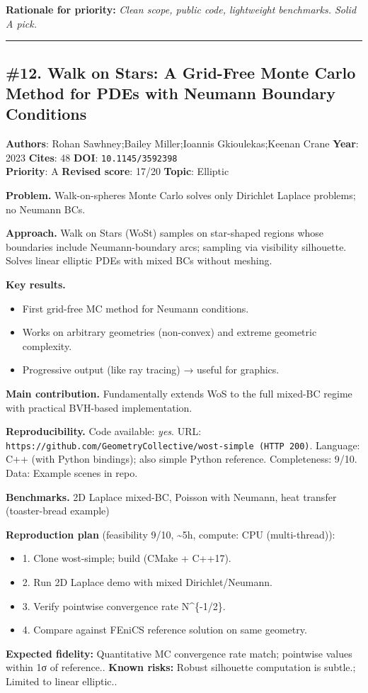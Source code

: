 \documentclass[10pt,letterpaper]{article}
\begin{document}
\textbf{Rationale for priority:} \emph{Clean scope, public code, lightweight benchmarks. Solid A pick.}

\medskip\hrule\medskip

\subsection*{\#12. Walk on Stars: A Grid-Free Monte Carlo Method for PDEs with Neumann Boundary Conditions}
\textbf{Authors}: Rohan Sawhney;Bailey Miller;Ioannis Gkioulekas;Keenan Crane \textbullet{} \textbf{Year}: 2023 \textbullet{} \textbf{Cites}: 48 \textbullet{} \textbf{DOI}: \texttt{10.1145/3592398} \\
\textbf{Priority}: A \textbullet{} \textbf{Revised score}: 17/20 \textbullet{} \textbf{Topic}: Elliptic

\textbf{Problem.} Walk-on-spheres Monte Carlo solves only Dirichlet Laplace problems; no Neumann BCs.

\textbf{Approach.} Walk on Stars (WoSt) samples on star-shaped regions whose boundaries include Neumann-boundary arcs; sampling via visibility silhouette. Solves linear elliptic PDEs with mixed BCs without meshing.

\textbf{Key results.}
\begin{itemize}
\item First grid-free MC method for Neumann conditions.
\item Works on arbitrary geometries (non-convex) and extreme geometric complexity.
\item Progressive output (like ray tracing) → useful for graphics.
\end{itemize}

\textbf{Main contribution.} Fundamentally extends WoS to the full mixed-BC regime with practical BVH-based implementation.

\textbf{Reproducibility.} Code available: \emph{yes}. URL: \texttt{https://github.com/GeometryCollective/wost-simple (HTTP 200)}. Language: C++ (with Python bindings); also simple Python reference. Completeness: 9/10. Data: Example scenes in repo.

\textbf{Benchmarks.} 2D Laplace mixed-BC, Poisson with Neumann, heat transfer (toaster-bread example)

\textbf{Reproduction plan} (feasibility 9/10, \textasciitilde5h, compute: CPU (multi-thread)):
\begin{itemize}
\item 1. Clone wost-simple; build (CMake + C++17).
\item 2. Run 2D Laplace demo with mixed Dirichlet/Neumann.
\item 3. Verify pointwise convergence rate N\^{}\{-1/2\}.
\item 4. Compare against FEniCS reference solution on same geometry.
\end{itemize}
\textbf{Expected fidelity:} Quantitative MC convergence rate match; pointwise values within 1σ of reference.. \textbf{Known risks:} Robust silhouette computation is subtle.; Limited to linear elliptic..
\end{document}

